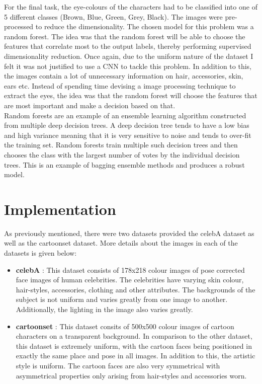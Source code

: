 \documentclass{article}
\begin{document}
	    For the final task, the eye-colours of the characters had to be classified into one of 5 different classes (Brown, Blue, Green, Grey, Black). The images were pre-processed to reduce the dimensionality. The chosen model for this problem was a random forest. The idea was that the random forest will be able to choose the features that correlate most to the output labels, thereby performing supervised dimensionality reduction. Once again, due to the uniform nature of the dataset I felt it was not justified to use a CNN to tackle this problem. In addition to this, the images contain a lot of unnecessary information on hair, accessories, skin, ears etc. Instead of spending time devising a image processing technique to extract the eyes, the idea was that the random forest will choose the features that are most important and make a decision based on that.
		\\
		
		Random forests are an example of an ensemble learning algorithm constructed from multiple deep decision trees. A deep decision tree tends to have a low bias and high variance meaning that it is very sensitive to noise and tends to over-fit the training set. Random forests train multiple such decision trees and then chooses the class with the largest number of votes by the individual decision trees. This is an example of bagging ensemble methods and produces a robust model.
		
\section{Implementation}
\label{sec:implementation_of_models}

	As previously mentioned, there were two datasets provided the celebA dataset as well as the cartoonset dataset. More details about the images in each of the datasets is given below:
	
	\begin{itemize}
		\item \textbf{celebA} : This dataset consists of 178x218 colour images of pose corrected face images of human celebrities. The celebrities have varying skin colour, hair-styles, accessories, clothing and other attributes. The backgrounds of the subject is not uniform and varies greatly from one image to another. Additionally, the lighting in the image also varies greatly.
		\item \textbf{cartoonset} : This dataset consits of 500x500 colour images of cartoon characters on a transparent background. In comparison to the other dataset, this dataset is extremely uniform, with the cartoon faces being positioned in exactly the same place and pose in all images. In addition to this, the artistic style is uniform. The cartoon faces are also very symmetrical with asymmetrical properties only arising from hair-styles and accessories worn. 
	\end{itemize}
	
\end{document}
